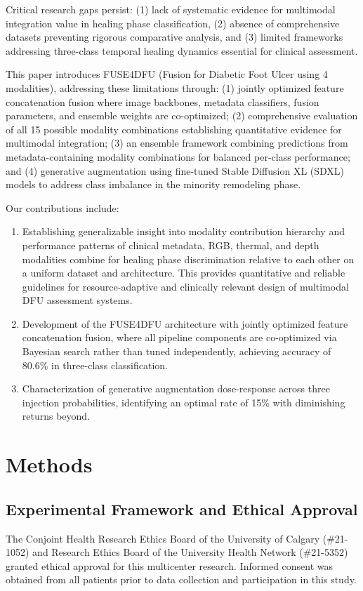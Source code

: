 \documentclass[journal,twoside,web]{ieeecolor}
\begin{document}
Critical research gaps persist: (1) lack of systematic evidence for multimodal integration value in healing phase classification, (2) absence of comprehensive datasets preventing rigorous comparative analysis, and (3) limited frameworks addressing three-class temporal healing dynamics essential for clinical assessment.

This paper introduces FUSE4DFU (Fusion for Diabetic Foot Ulcer using 4 modalities), addressing these limitations through: (1) jointly optimized feature concatenation fusion where image backbones, metadata classifiers, fusion parameters, and ensemble weights are co\nobreakdash-optimized; (2) comprehensive evaluation of all 15 possible modality combinations establishing quantitative evidence for multimodal integration; (3) an ensemble framework combining predictions from metadata\nobreakdash-containing modality combinations for balanced per\nobreakdash-class performance; and (4) generative augmentation using fine\nobreakdash-tuned Stable Diffusion XL (SDXL) models to address class imbalance in the minority remodeling phase.

Our contributions include:
\begin{enumerate}
\item Establishing generalizable insight into modality contribution hierarchy and performance patterns of clinical metadata, RGB, thermal, and depth modalities combine for healing phase discrimination relative to each other on a uniform dataset and architecture. This provides quantitative and reliable guidelines for resource\nobreakdash-adaptive and clinically relevant design of multimodal DFU assessment systems.  
\item Development of the FUSE4DFU architecture with jointly optimized feature concatenation fusion, where all pipeline components are co\nobreakdash-optimized via Bayesian search rather than tuned independently, achieving accuracy of 80.6\% in three\nobreakdash-class classification.
\item Characterization of generative augmentation dose\nobreakdash-response across three injection probabilities, identifying an optimal rate of 15\% with diminishing returns beyond.
\end{enumerate}

\section{Methods}

\subsection{Experimental Framework and Ethical Approval}
The Conjoint Health Research Ethics Board of the University of Calgary (\#21-1052) and Research Ethics Board of the University Health Network (\#21-5352) granted ethical approval for this multicenter research. Informed consent was obtained from all patients prior to data collection and participation in this study.
\end{document}
